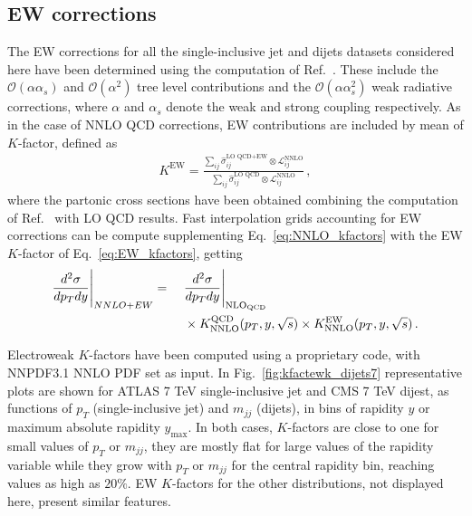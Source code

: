 \subsection{EW corrections}
The EW corrections for all the single-inclusive jet and dijets datasets considered here have been determined 
using the computation of Ref.~\cite{Dittmaier:2012kx}.
These include the $\mathcal{O}\left(\alpha\alpha_s\right)$ and $\mathcal{O}\left(\alpha^2\right)$ tree level contributions 
and the $\mathcal{O}\left(\alpha\alpha_s^2\right)$ weak radiative corrections, where $\alpha$ and $\alpha_s$
denote the weak and strong coupling respectively.
As in the case of NNLO QCD corrections, EW contributions are included by mean of $K$-factor, defined as
\begin{align}
    \label{eq:EW_kfactors}
    K^{\text{EW}} = \frac{\sum_{ij}\hat{\sigma}_{ij}^{\text{LO QCD}+\text{EW}}\otimes \mathcal{L}_{ij}^{\text{NNLO}}}
    {\sum_{ij}\hat{\sigma}_{ij}^{\text{LO QCD}}\otimes \mathcal{L}_{ij}^{\text{NNLO}}}\,,
\end{align}
where the partonic cross sections have been obtained combining the computation of Ref.~\cite{Dittmaier:2012kx} 
with LO QCD results.
Fast interpolation grids accounting for EW corrections can be compute
supplementing Eq.~\ref{eq:NNLO_kfactors} with the EW $K$-factor of Eq.~\ref{eq:EW_kfactors}, getting
\begin{align}
    \label{eq:NNLO_EW_kfactors}
    \frac{d^2\sigma}{dp_T dy}\Bigg|_{NNLO+EW} =\,\,\,\,\,\,\,\, &\frac{d^2\sigma}{dp_T dy} 
    \Bigg|_{\rm NLO_{QCD}} \nonumber\\ &\times K_{\rm NNLO}^{\rm QCD}(p_T,y,\sqrt{s})
    \times K_{\rm NNLO}^{\rm EW}(p_T,y,\sqrt{s})\,.
\end{align}

Electroweak $K$-factors have been computed using a proprietary code, with NNPDF3.1 NNLO PDF set as input.
In Fig.~\ref{fig:kfactewk_dijets7} representative plots are shown for ATLAS 7 TeV single-inclusive jet and CMS 7 TeV dijest,
as functions of $p_T$ (single-inclusive jet) and $m_{jj}$ (dijets), in bins of rapidity $y$
or maximum absolute rapidity $y_{\text{max}}$. In both cases, $K$-factors are close to one for small
values of $p_T$ or $m_{jj}$, they are mostly flat for large values of the rapidity variable while 
they grow with $p_T$ or $m_{jj}$  for the central rapidity bin, reaching values as high as $20\%$.
EW $K$-factors for the other distributions, not displayed here, present similar features.

